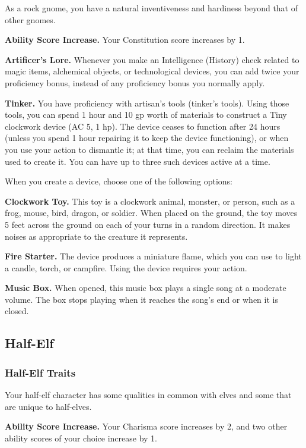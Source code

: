 \documentclass[
]{article}
\begin{document}
As a rock gnome, you have a natural inventiveness and hardiness beyond
that of other gnomes.

\textbf{Ability Score Increase.} Your Constitution score increases by 1.

\textbf{Artificer's Lore.} Whenever you make an Intelligence (History)
check related to magic items, alchemical objects, or technological
devices, you can add twice your proficiency bonus, instead of any
proficiency bonus you normally apply.

\textbf{Tinker.} You have proficiency with artisan's tools (tinker's
tools). Using those tools, you can spend 1 hour and 10 gp worth of
materials to construct a Tiny clockwork device (AC 5, 1 hp). The device
ceases to function after 24 hours (unless you spend 1 hour repairing it
to keep the device functioning), or when you use your action to
dismantle it; at that time, you can reclaim the materials used to create
it. You can have up to three such devices active at a time.

When you create a device, choose one of the following options:

\textbf{Clockwork Toy.} This toy is a clockwork animal, monster, or
person, such as a frog, mouse, bird, dragon, or soldier. When placed on
the ground, the toy moves 5 feet across the ground on each of your turns
in a random direction. It makes noises as appropriate to the creature it
represents.

\textbf{Fire Starter.} The device produces a miniature flame, which you
can use to light a candle, torch, or campfire. Using the device requires
your action.

\textbf{Music Box.} When opened, this music box plays a single song at a
moderate volume. The box stops playing when it reaches the song's end or
when it is closed.

\hypertarget{half-elf}{%
\subsection{Half-Elf}\label{half-elf}}

\hypertarget{half-elf-traits}{%
\subsubsection{Half-Elf Traits}\label{half-elf-traits}}

Your half-elf character has some qualities in common with elves and some
that are unique to half-elves.

\textbf{Ability Score Increase.} Your Charisma score increases by 2, and
two other ability scores of your choice increase by 1.
\end{document}
